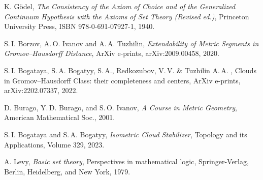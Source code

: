 \documentclass[leqno]{article}
\begin{document}
\begin{thebibliography}{99}
  K. G\"odel, \emph{The Consistency of the Axiom of Choice and of the
    Generalized Continuum Hypothesis with the Axioms of Set Theory
  (Revised ed.)}, Princeton University Press,  ISBN 978-0-691-07927-1, 1940.

  S.\,I. Borzov, A.\,O. Ivanov and A.\,A. Tuzhilin,
  \emph{Extendability of Metric Segments in Gromov--Hausdorff
  Distance}, ArXiv e-prints, arXiv:2009.00458, 2020.

  S.\,I. Bogataya, S.\,A. Bogatyy, S.\,A., Redkozubov, V.\,V. \&
  Tuzhilin A.\,A. , Clouds in Gromov--Hausdorff Class: their
  completeness and centers, ArXiv e-prints, arXiv:2202.07337, 2022.

  D. Burago, Y.\,D. Burago, and S.\,O. Ivanov, \emph{A Course in
  Metric Geometry}, American Mathematical Soc., 2001.

  S.\,I. Bogataya and S.\,A. Bogatyy, \emph{Isometric Cloud
  Stabilizer}, Topology and its Applications, Volume 329, 2023.

  A. Levy, \emph{Basic set theory}, Perspectives in
  mathematical logic, Springer-Verlag, Berlin, Heidelberg, and New York, 1979.

\end{thebibliography}
\end{document}
